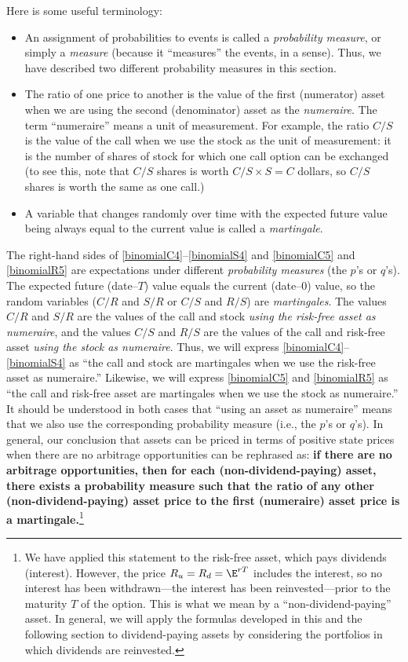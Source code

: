 Here is some useful terminology:
\begin{itemize}
\item An assignment of probabilities to events is called a \emph{probability measure}, or simply a \emph{measure} (because it ``measures'' the events, in a sense).  Thus, we have described two different probability measures in this section.   
\item The ratio of one price to another is the value of the first (numerator) asset  when we are using the second (denominator) asset  as the \emph{numeraire}.   The term ``numeraire'' means a unit of measurement.  For example, the ratio $C/S$ is the value of the call when we use the stock as the unit of measurement: it is the number of shares of stock for which one call option can be exchanged (to see this, note that $C/S$ shares is worth $C/S \times S = C$ dollars, so $C/S$ shares is worth the same as one call.) 
\item A variable that changes randomly over time with the expected future value being always equal to the current value is called a \emph{martingale}. 
\end{itemize}

The right-hand sides of  \eqref{binomialC4}--\eqref{binomialS4} and \eqref{binomialC5} and \eqref{binomialR5} are expectations under different \emph{probability measures} (the $p$'s or $q$'s).  The expected future (date--$T$) value equals the current (date--0) value, so the random variables ($C/R$ and $S/R$ or $C/S$ and $R/S$) are \emph{martingales}.  The values $C/R$ and $S/R$ are the values of the call and stock \emph{using the risk-free asset as numeraire}, and the values $C/S$ and $R/S$ are the values of the call and risk-free asset \emph{using the stock as numeraire}.  Thus, we will express  \eqref{binomialC4}--\eqref{binomialS4} as ``the call and stock are martingales when we use the risk-free asset as numeraire.''  Likewise, we will express  \eqref{binomialC5} and \eqref{binomialR5} as ``the call and risk-free asset are martingales when we use the stock as numeraire.''  It should be understood in both cases that ``using an asset as numeraire'' means that we also use the corresponding probability measure (i.e., the $p$'s or $q$'s).  In general, our conclusion that assets can be priced in terms of positive state prices when there are no arbitrage opportunities can be rephrased as: 
\textbf{if there are no arbitrage opportunities, then for each (non-dividend-paying) asset, there exists a probability measure  such that the ratio of any other (non-dividend-paying) asset price to the first (numeraire) asset price is a martingale.}\footnote{We have applied this statement to the risk-free asset, which pays dividends (interest).  However, the price $R_u=R_d=\E^{rT}$ includes the interest, so no interest has been withdrawn---the interest has been reinvested---prior to the maturity $T$ of the option.  This is what we mean by a ``non-dividend-paying'' asset.  In general, we will apply the formulas developed in this and the following section to dividend-paying assets by considering the portfolios in which dividends are reinvested.} 

